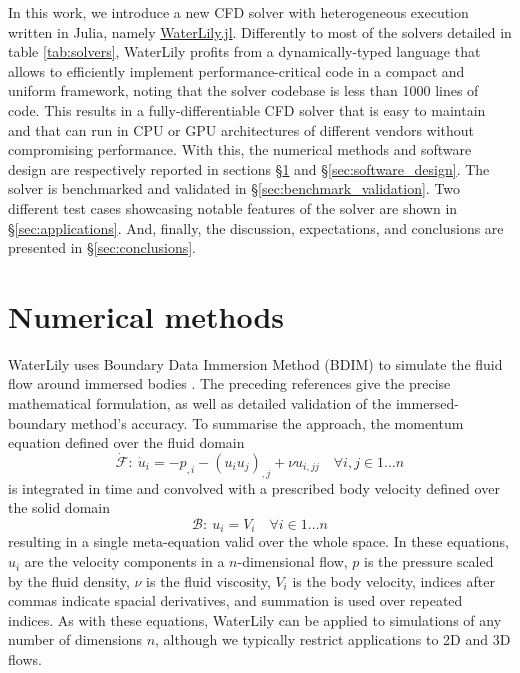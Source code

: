 \documentclass[final,3p,times]{elsarticle}
\begin{document}
In this work, we introduce a new CFD solver with heterogeneous execution written in Julia, namely \href{https://github.com/WaterLily-jl/WaterLily.jl}{WaterLily.jl}. Differently to most of the solvers detailed in table \ref{tab:solvers}, WaterLily profits from a dynamically-typed language that allows to efficiently implement performance-critical code in a compact and uniform framework, noting that the solver codebase is less than 1000 lines of code. This results in a fully-differentiable CFD solver that is easy to maintain and that can run in CPU or GPU architectures of different vendors without compromising performance. With this, the numerical methods and software design are respectively reported in sections \S\ref{sec:numerical_methods} and \S\ref{sec:software_design}. The solver is benchmarked and validated in \S\ref{sec:benchmark_validation}. Two different test cases showcasing notable features of the solver are shown in \S\ref{sec:applications}. And, finally, the discussion, expectations, and conclusions are presented in \S\ref{sec:conclusions}.

\section{Numerical methods}\label{sec:numerical_methods}
WaterLily uses Boundary Data Immersion Method (BDIM) to simulate the fluid flow around immersed bodies \cite{Weymouth2011,Maertens2014,Lauber2022}. The preceding references give the precise mathematical formulation, as well as detailed validation of the immersed-boundary method's accuracy. To summarise the approach, the momentum equation defined over the fluid domain
\begin{equation}
    \mathcal{\dot F}:\ \dot u_i = -p_{,i} - (u_i u_j)_{,j}+\nu u_{i,jj} \quad \forall i,j \in 1\ldots n
\end{equation}
is integrated in time and convolved with a prescribed body velocity defined over the solid domain
\begin{equation}
    \mathcal{B}:\ u_i = V_i \quad \forall i \in 1\ldots n
\end{equation}
resulting in a single meta-equation valid over the whole space. In these equations, $u_i$ are the velocity components in a $n$-dimensional flow, $p$ is the pressure scaled by the fluid density, $\nu$ is the fluid viscosity, $V_i$ is the body velocity, indices after commas indicate spacial derivatives, and summation is used over repeated indices. As with these equations, WaterLily can be applied to simulations of any number of dimensions $n$, although we typically restrict applications to 2D and 3D flows.
\end{document}
